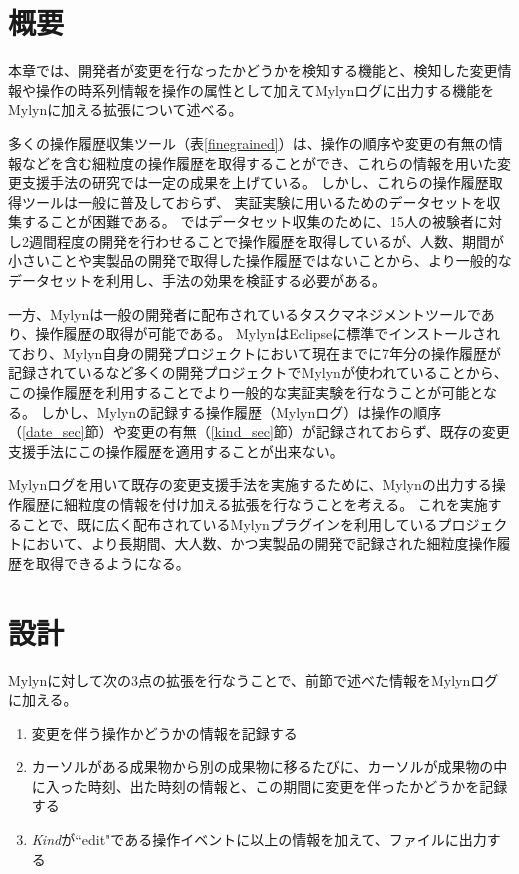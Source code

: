 \documentclass[a4paper]{jsbook}
\begin{document}
\section{概要}
本章では、開発者が変更を行なったかどうかを検知する機能と、検知した変更情報や操作の時系列情報を操作の属性として加えてMylynログに出力する機能をMylynに加える拡張について述べる。

多くの操作履歴収集ツール（表\ref{finegrained}）は、操作の順序や変更の有無の情報などを含む細粒度の操作履歴を取得することができ、これらの情報を用いた変更支援手法の研究では一定の成果を上げている。
しかし、これらの操作履歴取得ツールは一般に普及しておらず、
実証実験に用いるためのデータセットを収集することが困難である。
\cite{6233415,KatoJapanese:2011,ss2012-76,ss2013-84,Yamamori:2016}ではデータセット収集のために、15人の被験者に対し2週間程度の開発を行わせることで操作履歴を取得しているが、人数、期間が小さいことや実製品の開発で取得した操作履歴ではないことから、より一般的なデータセットを利用し、手法の効果を検証する必要がある。

一方、Mylyn\cite{Kersten:2005}は一般の開発者に配布されているタスクマネジメントツールであり、操作履歴の取得が可能である。
MylynはEclipseに標準でインストールされており、Mylyn自身の開発プロジェクトにおいて現在までに7年分の操作履歴が記録されているなど多くの開発プロジェクトでMylynが使われていることから、この操作履歴を利用することでより一般的な実証実験を行なうことが可能となる。
しかし、Mylynの記録する操作履歴（Mylynログ）は操作の順序（\ref{date_sec}節）や変更の有無（\ref{kind_sec}節）が記録されておらず、既存の変更支援手法にこの操作履歴を適用することが出来ない。

Mylynログを用いて既存の変更支援手法を実施するために、Mylynの出力する操作履歴に細粒度の情報を付け加える拡張を行なうことを考える。
これを実施することで、既に広く配布されているMylynプラグインを利用しているプロジェクトにおいて、より長期間、大人数、かつ実製品の開発で記録された細粒度操作履歴を取得できるようになる。

\section{設計}
Mylynに対して次の3点の拡張を行なうことで、前節で述べた情報をMylynログに加える。

\begin{enumerate}
  \item 変更を伴う操作かどうかの情報を記録する
  \item カーソルがある成果物から別の成果物に移るたびに、カーソルが成果物の中に入った時刻、出た時刻の情報と、この期間に変更を伴ったかどうかを記録する
  \item {\it Kind}が``edit"である操作イベントに以上の情報を加えて、ファイルに出力する
\end{enumerate}
\end{document}
